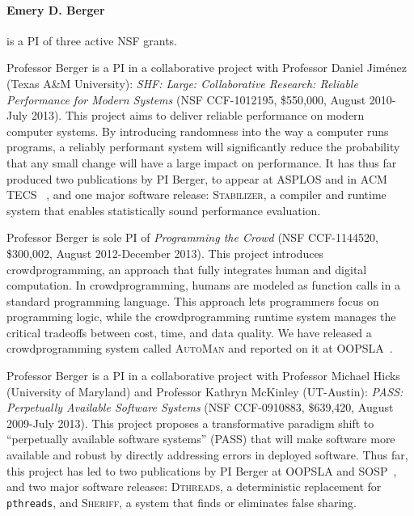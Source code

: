 \paragraph{Emery D. Berger} is a PI of three active NSF grants.



Professor Berger is a PI in a collaborative project with Professor
Daniel Jim\'enez (Texas A\&M University): {\em SHF: Large:
Collaborative Research: Reliable Performance for Modern Systems} (NSF
CCF-1012195, \$550,000, August 2010-July 2013). This project aims to
deliver reliable performance on modern computer systems. By
introducing randomness into the way a computer runs programs, a
reliably performant system will significantly reduce the probability
that any small change will have a large impact on performance.  It has
thus far produced two publications by PI Berger, to appear at ASPLOS
and in ACM TECS ~\cite{proartis2013,stabilizer:asplos13}, and one
major software release: \textsc{Stabilizer}, a compiler and runtime
system that enables statistically sound performance evaluation.

Professor Berger is sole PI of {\em Programming the Crowd} (NSF
CCF-1144520, \$300,002, August 2012-December 2013). This project
introduces crowdprogramming, an approach that fully integrates human
and digital computation. In crowdprogramming, humans are modeled as
function calls in a standard programming language. This approach lets
programmers focus on programming logic, while the crowdprogramming
runtime system manages the critical tradeoffs between cost, time, and
data quality. We have released a crowdprogramming system
called \textsc{AutoMan} and reported on it at
OOPSLA~\cite{Barowy:2012:API:2384616.2384663}.

Professor Berger is a PI in a collaborative project with Professor
Michael Hicks (University of Maryland) and Professor Kathryn McKinley
(UT-Austin): {\em PASS: Perpetually Available Software Systems} (NSF
CCF-0910883, \$639,420, August 2009-July 2013). This project proposes
a transformative paradigm shift to ``perpetually available software
systems'' (PASS) that will make software more available and robust by
directly addressing errors in deployed software. Thus far, this
project has led to two publications by PI Berger at OOPSLA and
SOSP~\cite{Liu:2011:DED:2043556.2043587,Liu:2011:SPD:2048066.2048070},
and two major software releases: \textsc{Dthreads}, a deterministic
replacement for \texttt{pthreads}, and \textsc{Sheriff}, a system that finds or eliminates false sharing.


